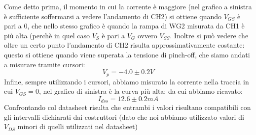\documentclass[10pt, a4paper, italian]{article}
\begin{document}
Come detto prima, il momento in cui la corrente è maggiore (nel grafico a sinistra è sufficiente soffermarsi a vedere l'andamento di CH2) si ottiene quando $V_{GS}$ è pari a 0, che nello stesso grafico è quando la rampa di WG2 misurata da CH1 è più alta (perchè in quel caso $V_S$ è pari a $V_G$ ovvero $V_{SS}$.
Inoltre si può vedere che oltre un certo punto l'andamento di CH2 risulta approssimativamente costante: questo si ottiene quando viene superata la tensione di pinch-off, che siamo andati a misurare tramite cursori:
\[
V_p=-4.0 \pm 0.2 V
\]
Infine, sempre utilizzando i cursori, abbiamo misurato la corrente nella traccia in cui $V_{GS}=0$, nel grafico di sinistra è la curva più alta; da cui abbiamo ricavato:
\[
I_{dss}=12.6 \pm 0.2 mA
\]
Confrontando col datasheet risulta che entrambi i valori risultano compatibili con gli intervalli dichiarati dai costruttori (dato che noi abbiamo utilizzato valori di $V_{DS}$ minori di quelli utilizzati nel datasheet)
\end{document}
